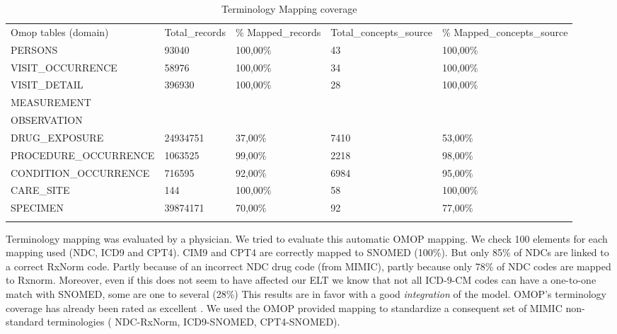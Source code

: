 
\begin{table*}[t]
\caption{Terminology Mapping coverage}
\begin{tabular}{@{}lllll@{}}\toprule
Omop tables (domain)   & Total\_records & \% Mapped\_records  & Total\_concepts\_source & \% Mapped\_concepts\_source  \\\colrule
PERSONS                & 93040          & 100,00\%            & 43                      & 100,00\%                     \\
VISIT\_OCCURRENCE      & 58976          & 100,00\%            & 34                      & 100,00\%                     \\
VISIT\_DETAIL          & 396930         & 100,00\%            & 28                      & 100,00\%                     \\
MEASUREMENT            &                &                     &                         &                              \\
OBSERVATION            &                &                     &                         &                              \\
DRUG\_EXPOSURE         & 24934751       & 37,00\%             & 7410                    & 53,00\%                      \\
PROCEDURE\_OCCURRENCE  & 1063525        & 99,00\%             & 2218                    & 98,00\%                      \\
CONDITION\_OCCURRENCE  & 716595         & 92,00\%             & 6984                    & 95,00\%                      \\
CARE\_SITE             & 144            & 100,00\%            & 58                      & 100,00\%                     \\
SPECIMEN               & 39874171       & 70,00\%             & 92                      & 77,00\%                      \\\botrule
\end{tabular}
\label{table:mapping}
\end{table*}

Terminology mapping was evaluated by a physician. 
We tried to evaluate this automatic OMOP mapping. We check 100 elements for each 
mapping used (NDC, ICD9 and CPT4). CIM9 and CPT4 are correctly mapped to SNOMED 
(100\%). But only 85\% of NDCs are linked to a correct RxNorm code. 
Partly because of an incorrect NDC drug code (from MIMIC), partly because only 78\% 
of NDC codes are mapped to Rxnorm. Moreover, even if this does not seem to have 
affected our ELT we know that not all ICD-9-CM codes can have a one-to-one match 
with SNOMED, some are one to several (28\%) \cite{snomed-icd9}
This results are in favor with a good \textit{integration} of the model.
OMOP's terminology coverage has already been rated as excellent
\cite{omop-vs-pcornet}. We used the OMOP provided mapping to standardize a
consequent set of MIMIC non-standard terminologies ( NDC-RxNorm, ICD9-SNOMED,
CPT4-SNOMED). 

